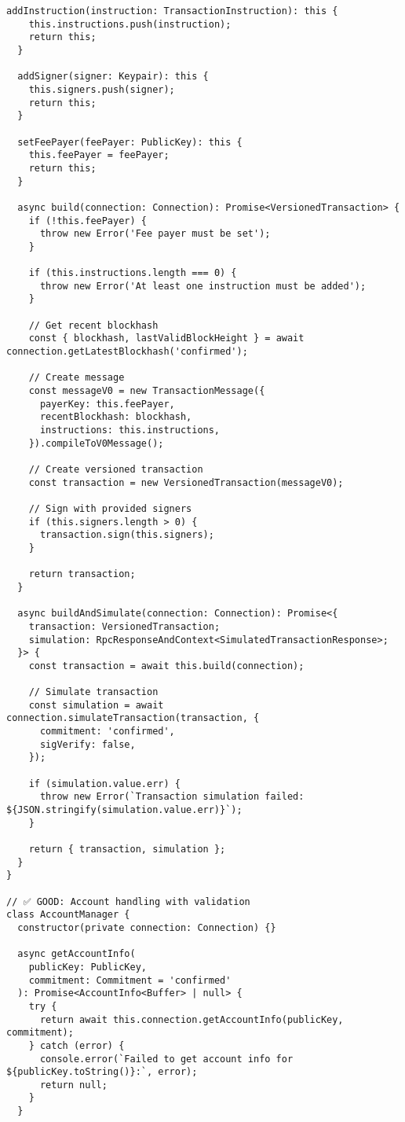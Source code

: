 \documentclass[11pt,a4paper]{article}
\begin{document}
\begin{lstlisting}[style=typescript, caption=Solana Web3.js Standards]
  addInstruction(instruction: TransactionInstruction): this {
    this.instructions.push(instruction);
    return this;
  }
  
  addSigner(signer: Keypair): this {
    this.signers.push(signer);
    return this;
  }
  
  setFeePayer(feePayer: PublicKey): this {
    this.feePayer = feePayer;
    return this;
  }
  
  async build(connection: Connection): Promise<VersionedTransaction> {
    if (!this.feePayer) {
      throw new Error('Fee payer must be set');
    }
    
    if (this.instructions.length === 0) {
      throw new Error('At least one instruction must be added');
    }
    
    // Get recent blockhash
    const { blockhash, lastValidBlockHeight } = await connection.getLatestBlockhash('confirmed');
    
    // Create message
    const messageV0 = new TransactionMessage({
      payerKey: this.feePayer,
      recentBlockhash: blockhash,
      instructions: this.instructions,
    }).compileToV0Message();
    
    // Create versioned transaction
    const transaction = new VersionedTransaction(messageV0);
    
    // Sign with provided signers
    if (this.signers.length > 0) {
      transaction.sign(this.signers);
    }
    
    return transaction;
  }
  
  async buildAndSimulate(connection: Connection): Promise<{
    transaction: VersionedTransaction;
    simulation: RpcResponseAndContext<SimulatedTransactionResponse>;
  }> {
    const transaction = await this.build(connection);
    
    // Simulate transaction
    const simulation = await connection.simulateTransaction(transaction, {
      commitment: 'confirmed',
      sigVerify: false,
    });
    
    if (simulation.value.err) {
      throw new Error(`Transaction simulation failed: ${JSON.stringify(simulation.value.err)}`);
    }
    
    return { transaction, simulation };
  }
}

// ✅ GOOD: Account handling with validation
class AccountManager {
  constructor(private connection: Connection) {}
  
  async getAccountInfo(
    publicKey: PublicKey,
    commitment: Commitment = 'confirmed'
  ): Promise<AccountInfo<Buffer> | null> {
    try {
      return await this.connection.getAccountInfo(publicKey, commitment);
    } catch (error) {
      console.error(`Failed to get account info for ${publicKey.toString()}:`, error);
      return null;
    }
  }
  

\end{lstlisting}
\end{document}
